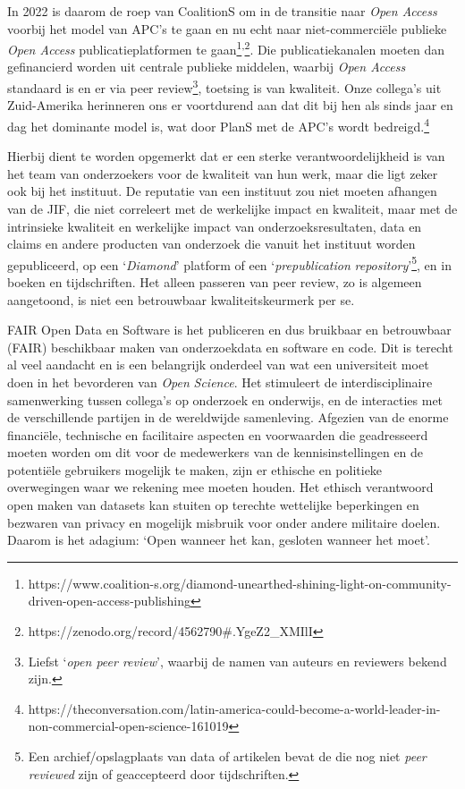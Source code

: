 \documentclass[smallauthor, chapterhaspagenum, nochapterinheader, pagenuminheader,  bigchapnum,medium2, tocpages,  garamond, titleinheader]{jote-book}
\begin{document}
	In 2022 is daarom de roep van CoalitionS om in de transitie naar \emph{Open Access} voorbij het model van APC's te gaan en nu echt naar niet-commerciële publieke \emph{Open Access} publicatieplatformen te gaan\footnote{https://www.coalition-s.org/diamond-unearthed-shining-light-on-community-driven-open-access-publishing}\textsuperscript{,}\footnote{https://zenodo.org/record/4562790\#.YgeZ2\_XMIlI}. Die publicatiekanalen moeten dan gefinancierd worden uit centrale publieke middelen, waarbij \emph{Open Access} standaard is en er via peer review\footnote{Liefst ‘\emph{open peer review}', waarbij de namen van auteurs en reviewers bekend zijn.}, toetsing is van kwaliteit. Onze collega's uit Zuid-Amerika herinneren ons er voortdurend aan dat dit bij hen als sinds jaar en dag het dominante model is, wat door PlanS met de APC's wordt bedreigd.\footnote{https://theconversation.com/latin-america-could-become-a-world-leader-in-non-commercial-open-science-161019}



	Hierbij dient te worden opgemerkt dat er een sterke verantwoordelijkheid is van het team van onderzoekers voor de kwaliteit van hun werk, maar die ligt zeker ook bij het instituut. De reputatie van een instituut zou niet moeten afhangen van de JIF, die niet correleert met de werkelijke impact en kwaliteit, maar met de intrinsieke kwaliteit en werkelijke impact van onderzoeksresultaten, data en claims en andere producten van onderzoek die vanuit het instituut worden gepubliceerd, op een ‘\emph{Diamond}' platform of een ‘\emph{prepublication}\emph{ }\emph{repository}'\footnote{Een archief/opslagplaats van data of artikelen bevat de die nog niet \emph{peer }\emph{reviewed} zijn of geaccepteerd door tijdschriften.}, en in boeken en tijdschriften. Het alleen passeren van peer review, zo is algemeen aangetoond, is niet een betrouwbaar kwaliteitskeurmerk per se.



	FAIR Open Data en Software is het publiceren en dus bruikbaar en betrouwbaar (FAIR) beschikbaar maken van onderzoekdata en software en code. Dit is terecht al veel aandacht en is een belangrijk onderdeel van wat een universiteit moet doen in het bevorderen van \emph{Open }\emph{Science}. Het stimuleert de interdisciplinaire samenwerking tussen collega's op onderzoek en onderwijs, en de interacties met de verschillende partijen in de wereldwijde samenleving. Afgezien van de enorme financiële, technische en facilitaire aspecten en voorwaarden die geadresseerd moeten worden om dit voor de medewerkers van de kennisinstellingen en de potentiële gebruikers mogelijk te maken, zijn er ethische en politieke overwegingen waar we rekening mee moeten houden. Het ethisch verantwoord open maken van datasets kan stuiten op terechte wettelijke beperkingen en bezwaren van privacy en mogelijk misbruik voor onder andere militaire doelen. Daarom is het adagium: ‘Open wanneer het kan, gesloten wanneer het moet'.
\end{document}
